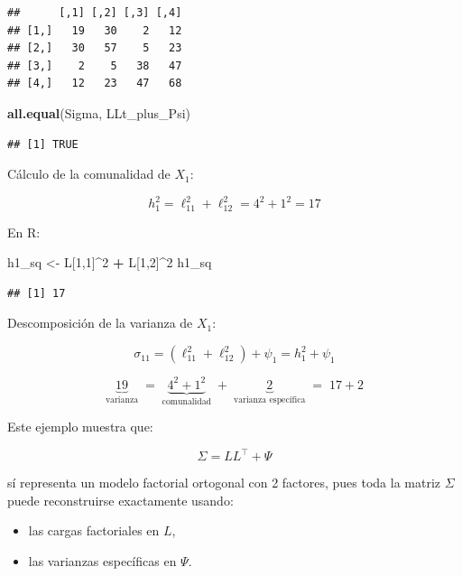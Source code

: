 \documentclass[
]{book}
\newenvironment{Shaded}{\begin{snugshade}}{\end{snugshade}}
\newcommand{\DecValTok}[1]{\textcolor[rgb]{0.00,0.00,0.81}{#1}}
\newcommand{\FunctionTok}[1]{\textcolor[rgb]{0.13,0.29,0.53}{\textbf{#1}}}
\newcommand{\NormalTok}[1]{#1}
\newcommand{\OtherTok}[1]{\textcolor[rgb]{0.56,0.35,0.01}{#1}}
\newcommand{\SpecialCharTok}[1]{\textcolor[rgb]{0.81,0.36,0.00}{\textbf{#1}}}
\begin{document}
\begin{verbatim}
##      [,1] [,2] [,3] [,4]
## [1,]   19   30    2   12
## [2,]   30   57    5   23
## [3,]    2    5   38   47
## [4,]   12   23   47   68
\end{verbatim}

\begin{Shaded}
\begin{Highlighting}[]
\FunctionTok{all.equal}\NormalTok{(Sigma, LLt\_plus\_Psi)}
\end{Highlighting}
\end{Shaded}

\begin{verbatim}
## [1] TRUE
\end{verbatim}

Cálculo de la comunalidad de \(X_1\):

\[h_1^2 = \ell_{11}^2 + \ell_{12}^2 = 4^2 + 1^2 = 17\]

En R:

\begin{Shaded}
\begin{Highlighting}[]
\NormalTok{h1\_sq }\OtherTok{\textless{}{-}}\NormalTok{ L[}\DecValTok{1}\NormalTok{,}\DecValTok{1}\NormalTok{]}\SpecialCharTok{\^{}}\DecValTok{2} \SpecialCharTok{+}\NormalTok{ L[}\DecValTok{1}\NormalTok{,}\DecValTok{2}\NormalTok{]}\SpecialCharTok{\^{}}\DecValTok{2}
\NormalTok{h1\_sq}
\end{Highlighting}
\end{Shaded}

\begin{verbatim}
## [1] 17
\end{verbatim}

Descomposición de la varianza de \(X_1\):

\[\sigma_{11} = (\ell_{11}^2 + \ell_{12}^2) + \psi_1 = h_{1}^2 + \psi_1 \]

\[
\underbrace{19}_{\text{varianza}}
\;=\;
\underbrace{4^2 + 1^2}_{\text{comunalidad}}
\;+\;
\underbrace{2}_{\text{varianza específica}}
\;=\;
17 + 2
\]

Este ejemplo muestra que:

\[\Sigma= LL^\top+\Psi\]

sí representa un modelo factorial ortogonal con 2 factores, pues toda la matriz \(\Sigma\) puede reconstruirse exactamente usando:

\begin{itemize}
\item
  las cargas factoriales en \(L\),
\item
  las varianzas específicas en \(\Psi\).
\end{itemize}
\end{document}
